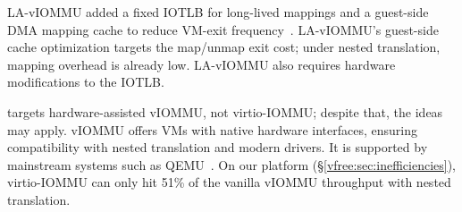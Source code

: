 
LA-vIOMMU added a fixed IOTLB for long-lived mappings and a guest-side DMA mapping cache 
    to reduce VM-exit frequency~\cite{Lv2022LAvIOMMU}.
LA-vIOMMU's guest-side cache optimization targets the map/unmap exit cost; 
    under nested translation, mapping overhead is already low. 
LA-vIOMMU also requires hardware modifications to the IOTLB.
\fi 







 \vfreebrand targets hardware-assisted vIOMMU, not virtio-IOMMU;
    despite that, the {\vfreename} ideas may apply.
vIOMMU offers VMs with native hardware interfaces, 
    ensuring compatibility with nested translation and modern drivers.
It is supported by mainstream systems such as QEMU~\cite{qemu_10_0}.
On our platform (\S\ref{vfree:sec:inefficiencies}),
    virtio-IOMMU can only hit 51\% of the vanilla 
    vIOMMU throughput with nested translation.






